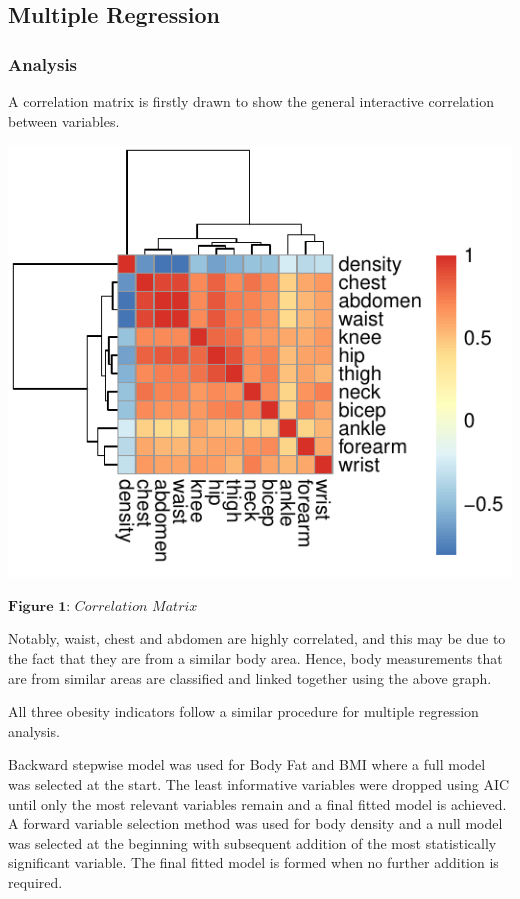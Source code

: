\documentclass[a4paper,9pt,twocolumn,twoside,]{pinp}
\begin{document}
\hypertarget{multiple-regression}{%
\subsection{Multiple Regression}\label{multiple-regression}}

\hypertarget{analysis-1}{%
\subsubsection{Analysis}\label{analysis-1}}

A correlation matrix is firstly drawn to show the general interactive
correlation between variables.

\begin{center}\includegraphics{Executive_Report_files/figure-latex/unnamed-chunk-1-1} \end{center}

\(\textbf{Figure 1:}\textit{ Correlation Matrix}\)

Notably, waist, chest and abdomen are highly correlated, and this may be
due to the fact that they are from a similar body area. Hence, body
measurements that are from similar areas are classified and linked
together using the above graph.

All three obesity indicators follow a similar procedure for multiple
regression analysis.

Backward stepwise model was used for Body Fat and BMI where a full model
was selected at the start. The least informative variables were dropped
using AIC until only the most relevant variables remain and a final
fitted model is achieved. A forward variable selection method was used
for body density and a null model was selected at the beginning with
subsequent addition of the most statistically significant variable. The
final fitted model is formed when no further addition is required.
\end{document}
